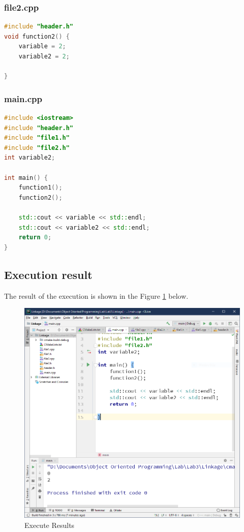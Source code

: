\documentclass[a4paper]{report}
\begin{document}
\subsubsection{file2.cpp}
\begin{lstlisting}[language=C++]
#include "header.h"
void function2() {
    variable = 2;
    variable2 = 2;

}
\end{lstlisting}

\subsubsection{main.cpp}
\begin{lstlisting}[language=C++]
#include <iostream>
#include "header.h"
#include "file1.h"
#include "file2.h"
int variable2;

int main() {
    function1();
    function2();

    std::cout << variable << std::endl;
    std::cout << variable2 << std::endl;
    return 0;
}
\end{lstlisting}



\subsection{Execution result}
The result of the execution is shown in the Figure \ref{1} below.

\begin{figure}
  \centering
  \includegraphics[scale=0.5]{result1.PNG}
  \caption{Execute Results}\label{1}
\end{figure}
\end{document}
